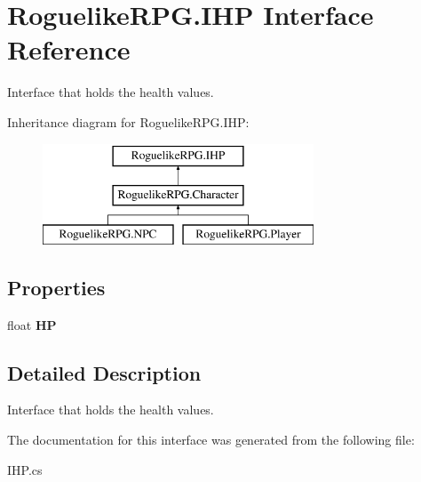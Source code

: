 \hypertarget{interface_roguelike_r_p_g_1_1_i_h_p}{}\section{Roguelike\+R\+P\+G.\+I\+HP Interface Reference}
\label{interface_roguelike_r_p_g_1_1_i_h_p}


Interface that holds the health values.  


Inheritance diagram for Roguelike\+R\+P\+G.\+I\+HP\+:\begin{figure}[H]
\begin{center}
\leavevmode
\includegraphics[height=3.000000cm]{interface_roguelike_r_p_g_1_1_i_h_p}
\end{center}
\end{figure}
\subsection*{Properties}
\begin{DoxyCompactItemize}
\item 
\mbox{\label{interface_roguelike_r_p_g_1_1_i_h_p_a4f0ed9c0d4a526d5eee62b2371e80408}} 
float {\bfseries HP}
\end{DoxyCompactItemize}


\subsection{Detailed Description}
Interface that holds the health values. 



The documentation for this interface was generated from the following file\+:\begin{DoxyCompactItemize}
\item 
I\+H\+P.\+cs\end{DoxyCompactItemize}
